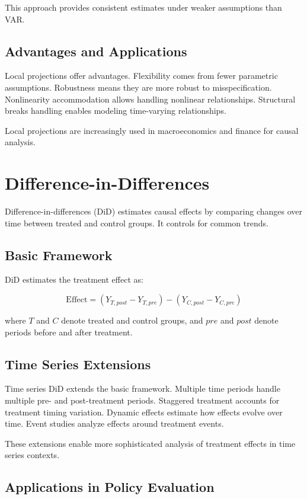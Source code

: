 This approach provides consistent estimates under weaker assumptions than VAR.

\subsection{Advantages and Applications}

Local projections offer advantages. Flexibility comes from fewer parametric assumptions. Robustness means they are more robust to misspecification. Nonlinearity accommodation allows handling nonlinear relationships. Structural breaks handling enables modeling time-varying relationships.

Local projections are increasingly used in macroeconomics and finance for causal analysis.

\section{Difference-in-Differences}

Difference-in-differences (DiD) estimates causal effects by comparing changes over time between treated and control groups. It controls for common trends.

\subsection{Basic Framework}

DiD estimates the treatment effect as:

\[
\text{Effect} = (Y_{T,post} - Y_{T,pre}) - (Y_{C,post} - Y_{C,pre})
\]

where \(T\) and \(C\) denote treated and control groups, and \(pre\) and \(post\) denote periods before and after treatment.

\subsection{Time Series Extensions}

Time series DiD extends the basic framework. Multiple time periods handle multiple pre- and post-treatment periods. Staggered treatment accounts for treatment timing variation. Dynamic effects estimate how effects evolve over time. Event studies analyze effects around treatment events.

These extensions enable more sophisticated analysis of treatment effects in time series contexts.

\subsection{Applications in Policy Evaluation}

